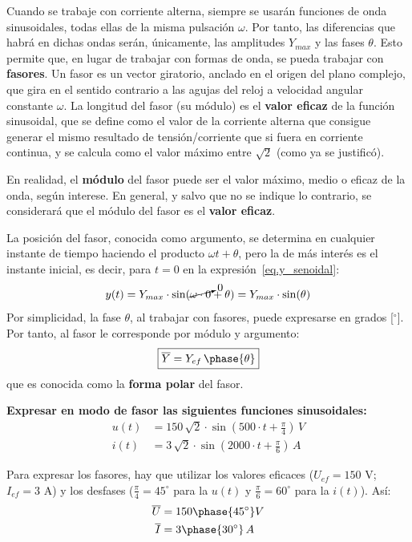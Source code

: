 \documentclass[11pt]{book} %
\begin{document}
	Cuando se trabaje con corriente alterna, siempre se usarán funciones de onda sinusoidales, todas ellas de la misma pulsación $\omega$. Por tanto, las diferencias que habrá en dichas ondas serán, únicamente, las amplitudes $Y_{max}$ y las fases $\theta$. Esto permite que, en lugar de trabajar con formas de onda, se pueda trabajar con \textbf{fasores}. Un fasor es un vector giratorio, anclado en el origen del plano complejo, que gira en el sentido contrario a las agujas del reloj a velocidad angular constante $\omega$. La longitud del fasor (su módulo) es el \textbf{valor eficaz} de la función sinusoidal, que se define como el valor de la corriente alterna que consigue generar el mismo resultado de tensión/corriente que si fuera en corriente continua, y se calcula como el valor máximo entre $\sqrt{2}$ (como ya se justificó). 
	\begin{remark}
	    En realidad, el \textbf{módulo} del fasor puede ser el valor máximo, medio o eficaz de la onda, según interese. En general, y salvo que no se indique lo contrario, se considerará que el módulo del fasor es el \textbf{valor eficaz}.
	\end{remark}
	La posición del fasor, conocida como argumento, se determina en cualquier instante de tiempo haciendo el producto $\omega t+\theta$, pero la de más interés es el instante inicial, es decir, para $t=0$ en la expresión~\eqref{eq.y_senoidal}:
	\begin{equation*}
		y(t)=Y_{max}\cdot\sin(\cancelto{0}{\omega \cdot 0}+\theta)=Y_{max}\cdot\sin(\theta)
	\end{equation*}
	Por simplicidad, la fase $\theta$, al trabajar con fasores, puede expresarse en grados [$^\circ$]. Por tanto, al fasor le corresponde por módulo y argumento:
	\begin{equation}
		\boxed{\overline{Y}=Y_{ef}\,\phase{\theta}}
	\end{equation}
	que es conocida como la \textbf{forma polar} del fasor.
	
	\begin{example}
		\textbf{Expresar en modo de fasor las siguientes funciones sinusoidales:}
		\begin{align*}
		    u(t)&=150\,\sqrt{2}\cdot \sin(500\cdot t+\frac{\pi}{4})\, V\\
		    i(t) &= 3\,\sqrt{2}\cdot \sin(2000\cdot t+\frac{\pi}{6})\,A
		\end{align*}
		
		Para expresar los fasores, hay que utilizar los valores eficaces ($U_{ef}=150$ V; $I_{ef}=3$ A) y los desfases ($\frac{\pi}{4}=45^\circ$ para la $u(t)$ y $\frac{\pi}{6}=60^\circ$ para la $i(t)$). Así: 
		\begin{align*}
		    \overline{U}&=150\phase{45^\circ} V\\
		    \overline{I}&=3\phase{30^\circ}\,A
		\end{align*}
	\end{example}
	
\end{document}
